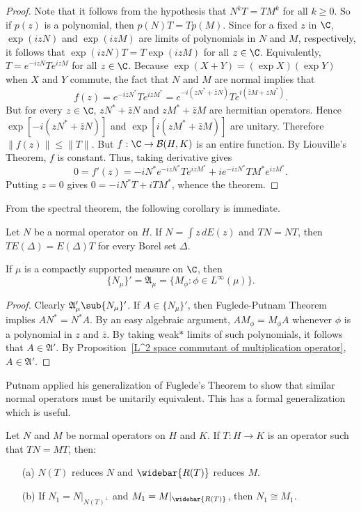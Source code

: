 \begin{proof}
Note that it follows from the hypothesis that $N^kT=TM^k$ for all $k\geq 0$. So if $p(z)$ is a polynomial, then $p(N)T=Tp(M)$. Since for a fixed $z$ in $\C$, $\exp(izN)$ and $\exp(izM)$ are limits of polynomials in $N$ and $M$, respectively, it follows that $\exp(izN)T=T\exp(izM)$ for all $z\in\C$. Equivalently, $T=e^{-izN}Te^{izM}$ for all $z\in\C$. Because $\exp(X+Y)=(\exp X)(\exp Y)$ when $X$ and $Y$ commute, the fact that $N$ and $M$ are normal implies that
\[f(z)=e^{-izN^*}Te^{izM^*}=e^{-i(zN^*+\bar{z}N)}Te^{i(\bar{z}M+zM^*)}.\]But for every $z\in\C$, $zN^*+\bar{z}N$ and $zM^*+\bar{z}M$ are hermitian operators. Hence $\exp[-i(zN^*+\bar{z}N)]$ and $\exp[i(zM^*+\bar{z}M)]$ are unitary. Therefore $\|f(z)\|\leq\|T\|$. But $f:\C\to\mathcal{B}(H,K)$ is an entire function. By Liouville's Theorem, $f$ is constant. Thus, taking derivative gives 
\[0=f'(z)=-iN^*e^{-izN^*}Te^{izM^*}+ie^{-izN^*}TM^*e^{izM^*}.\]
Putting $z=0$ gives $0=-iN^*T+iTM^*$, whence the theorem.
\end{proof}
From the spectral theorem, the following corollary is immediate.
\begin{corollary}
Let $N$ be a normal operator on $H$. If $N=\int z\,dE(z)$ and $TN=NT$, then $TE(\Delta)=E(\Delta)T$ for every
Borel set $\Delta$.
\end{corollary}
\begin{corollary}\label{L^2 space commutant of multiplication by identity}
If $\mu$ is a compactly supported measure on $\C$, then
\[\{N_\mu\}'=\mathfrak{A}_\mu=\{M_\phi:\phi\in L^\infty(\mu)\}.\]
\end{corollary}
\begin{proof}
Clearly $\mathfrak{A}_\mu'\sub\{N_\mu\}'$. If $A\in\{N_\mu\}'$, then Fuglede-Putnam Theorem implies $AN^*=N^*A$. By an easy algebraic argument, $AM_\phi=M_\phi A$ whenever $\phi$ is a polynomial in $z$ and $\bar{z}$. By taking weak$*$ limits of such polynomials, it follows that $A\in\mathfrak{A}'$. By Proposition~\ref{L^2 space commutant of multiplication operator}, $A\in\mathfrak{A}'$.
\end{proof}
Putnam applied his generalization of Fuglede's Theorem to show that similar normal operators must be unitarily equivalent. This has a formal generalization which is useful.
\begin{proposition}
Let $N$ and $M$ be normal operators on $H$ and $K$. If $T:H\to K$ is an operator such that $TN=MT$, then:
\begin{itemize}
\item[(a)] $N(T)$ reduces $N$ and $\widebar{R(T)}$ reduces $M$. 
\item[(b)] If $N_1=N|_{N(T)^\bot}$ and $M_1=M|_{\widebar{R(T)}}$, then $N_1\cong M_1$.
\end{itemize}
\end{proposition}
